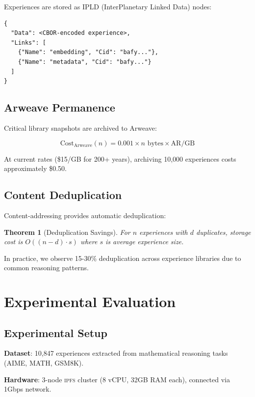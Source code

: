 \documentclass[11pt,letterpaper]{article}
\newtheorem{theorem}{Theorem}[section]
\newcommand{\IPFS}{\textsc{ipfs}}
\begin{document}
Experiences are stored as IPLD (InterPlanetary Linked Data) nodes:

\begin{lstlisting}[caption=IPLD Experience Node]
{
  "Data": <CBOR-encoded experience>,
  "Links": [
    {"Name": "embedding", "Cid": "bafy..."},
    {"Name": "metadata", "Cid": "bafy..."}
  ]
}
\end{lstlisting}

\subsection{Arweave Permanence}

Critical library snapshots are archived to Arweave:

\begin{equation}
\text{Cost}_{\text{Arweave}}(n) = 0.001 \times n \text{ bytes} \times \text{AR/GB}
\end{equation}

At current rates (\$15/GB for 200+ years), archiving 10,000 experiences costs approximately \$0.50.

\subsection{Content Deduplication}

Content-addressing provides automatic deduplication:

\begin{theorem}[Deduplication Savings]
For $n$ experiences with $d$ duplicates, storage cost is $O((n-d) \cdot s)$ where $s$ is average experience size.
\end{theorem}

In practice, we observe 15-30\% deduplication across experience libraries due to common reasoning patterns.

\section{Experimental Evaluation}
\label{sec:evaluation}

\subsection{Experimental Setup}

\textbf{Dataset}: 10,847 experiences extracted from mathematical reasoning tasks (AIME, MATH, GSM8K).

\textbf{Hardware}: 3-node \IPFS{} cluster (8 vCPU, 32GB RAM each), connected via 1Gbps network.
\end{document}
